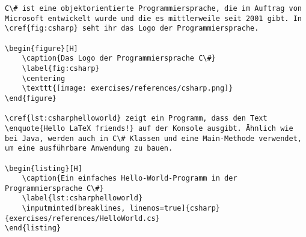 \begin{verbatim}
C\# ist eine objektorientierte Programmiersprache, die im Auftrag von Microsoft entwickelt wurde und die es mittlerweile seit 2001 gibt. In \cref{fig:csharp} seht ihr das Logo der Programmiersprache. 
	
\begin{figure}[H]
	\caption{Das Logo der Programmiersprache C\#}
	\label{fig:csharp}
	\centering
	\texttt{[image: exercises/references/csharp.png]}
\end{figure}

\cref{lst:csharphelloworld} zeigt ein Programm, dass den Text \enquote{Hello LaTeX friends!} auf der Konsole ausgibt. Ähnlich wie bei Java, werden auch in C\# Klassen und eine Main-Methode verwendet, um eine ausführbare Anwendung zu bauen. 
	
\begin{listing}[H]
	\caption{Ein einfaches Hello-World-Programm in der Programmiersprache C\#}
	\label{lst:csharphelloworld}
	\inputminted[breaklines, linenos=true]{csharp}{exercises/references/HelloWorld.cs}
\end{listing}
\end{verbatim}



	



